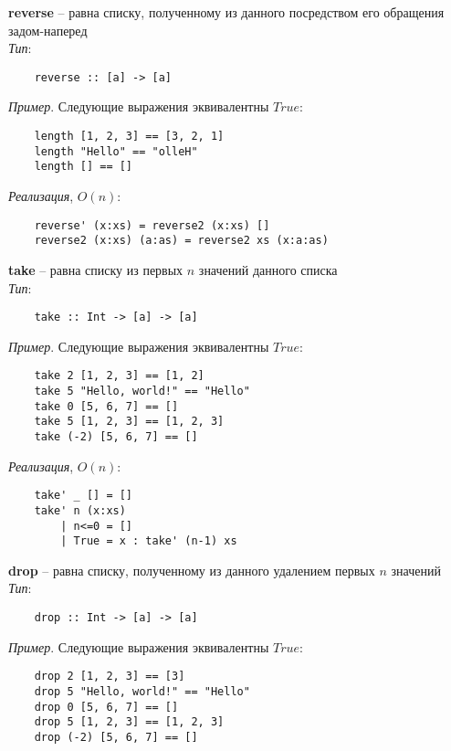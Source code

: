 \documentclass{article}
\begin{document}
	\null\textbf{reverse} -- равна списку, полученному из данного посредством его обращения задом-наперед\\

	\textit{Тип}:
	\begin{lstlisting}
	reverse :: [a] -> [a]
	\end{lstlisting}

	\null\textit{Пример}. Следующие выражения эквивалентны $True$:
	\begin{lstlisting}
	length [1, 2, 3] == [3, 2, 1]
	length "Hello" == "olleH"
	length [] == []
	\end{lstlisting}

	\null\textit{Реализация}, $O(n)$:
	\begin{lstlisting}
	reverse' (x:xs) = reverse2 (x:xs) []
	reverse2 (x:xs) (a:as) = reverse2 xs (x:a:as)
	\end{lstlisting}

	\null\textbf{take} -- равна списку из первых $n$ значений данного списка\\

	\textit{Тип}:
	\begin{lstlisting}
	take :: Int -> [a] -> [a]
	\end{lstlisting}

	\null\textit{Пример}. Следующие выражения эквивалентны $True$:
	\begin{lstlisting}
	take 2 [1, 2, 3] == [1, 2]
	take 5 "Hello, world!" == "Hello"
	take 0 [5, 6, 7] == []
	take 5 [1, 2, 3] == [1, 2, 3]
	take (-2) [5, 6, 7] == []
	\end{lstlisting}

	\null\textit{Реализация}, $O(n)$:
	\begin{lstlisting}
	take' _ [] = []
	take' n (x:xs)
		| n<=0 = []
		| True = x : take' (n-1) xs
	\end{lstlisting}

	\null\textbf{drop} -- равна списку, полученному из данного удалением первых $n$ значений\\

	\textit{Тип}:
	\begin{lstlisting}
	drop :: Int -> [a] -> [a]
	\end{lstlisting}

	\null\textit{Пример}. Следующие выражения эквивалентны $True$:
	\begin{lstlisting}
	drop 2 [1, 2, 3] == [3]
	drop 5 "Hello, world!" == "Hello"
	drop 0 [5, 6, 7] == []
	drop 5 [1, 2, 3] == [1, 2, 3]
	drop (-2) [5, 6, 7] == []
	\end{lstlisting}
\end{document}
